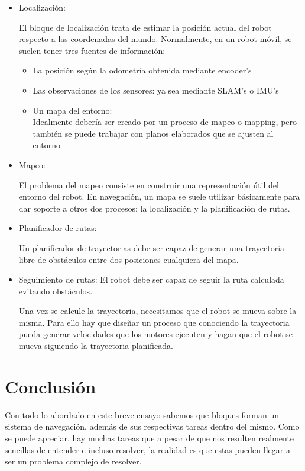 \documentclass[11pt]{article}
\begin{document}
\begin{itemize}
    \item Localización: 
    
    El bloque de localización trata de estimar la posición actual del robot respecto a las coordenadas del mundo. Normalmente, en un robot móvil, se suelen tener tres fuentes de información:
    \begin{itemize}
        \item La posición según la odometría obtenida mediante encoder's
        \item Las observaciones de los sensores: ya sea mediante SLAM's o IMU's
        \item Un mapa del entorno: \\
            Idealmente debería ser creado por un proceso de mapeo o mapping, pero también se puede trabajar con planos elaborados que se ajusten al entorno
        
        
    \end{itemize}

    \item Mapeo: 
    
    El problema del mapeo consiste en construir una representación útil del entorno del robot. En navegación, un mapa se suele utilizar básicamente para dar soporte a otros dos procesos: la localización y la planificación de rutas. 
    
    \item Planificador de rutas: 
    
    Un planificador de trayectorias debe ser capaz de generar una trayectoria libre de obstáculos entre dos posiciones cualquiera del mapa. 
    
    \item Seguimiento de rutas: El robot debe ser capaz de seguir la ruta calculada evitando obstáculos.
    
    Una vez se calcule la trayectoria, necesitamos que el robot se mueva sobre la misma. Para ello hay que diseñar un proceso que conociendo la trayectoria pueda generar velocidades que los motores ejecuten y hagan que el robot se mueva siguiendo la trayectoria planificada.
    
\end{itemize}

\section{Conclusión}

Con todo lo abordado en este breve ensayo sabemos que bloques forman un sistema de navegación, además de sus respectivas tareas dentro del mismo. Como se puede apreciar, hay muchas tareas que a pesar de que nos resulten realmente sencillas de entender e incluso resolver, la realidad es que estas pueden llegar a ser un problema complejo de resolver. \\
\end{document}
